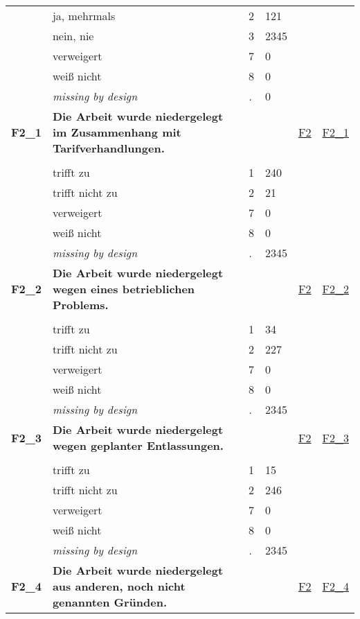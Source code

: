 \begin{longtable}{| L{2.45cm} | L{6cm} | C{1.5cm} | R{1cm} | C{2.25cm} | C{2.25cm} |}
   & ja, mehrmals & 2 & 121 &  &  \\ 
   & nein, nie & 3 & 2345 &  &  \\ 
   & verweigert & 7 & 0 &  &  \\ 
   & weiß nicht & 8 & 0 &  &  \\ 
   & \textit{missing by design} & \textit{.} & 0 &  &  \\ 
   \midrule
\textbf{F2\_1}\label{var:F2:1} & \textbf{Die Arbeit wurde niedergelegt im Zusammenhang mit Tarifverhandlungen.} &  &  & \hyperref[F2]{F2} & \hyperref[var:suf:F2:1]{F2\_1} \\ 
   &  &  &  &  &  \\ 
   & trifft zu & 1 & 240 &  &  \\ 
   & trifft nicht zu & 2 & 21 &  &  \\ 
   & verweigert & 7 & 0 &  &  \\ 
   & weiß nicht & 8 & 0 &  &  \\ 
   & \textit{missing by design} & \textit{.} & 2345 &  &  \\ 
   \midrule
\textbf{F2\_2}\label{var:F2:2} & \textbf{Die Arbeit wurde niedergelegt wegen eines betrieblichen Problems.} &  &  & \hyperref[F2]{F2} & \hyperref[var:suf:F2:2]{F2\_2} \\ 
   &  &  &  &  &  \\ 
   & trifft zu & 1 & 34 &  &  \\ 
   & trifft nicht zu & 2 & 227 &  &  \\ 
   & verweigert & 7 & 0 &  &  \\ 
   & weiß nicht & 8 & 0 &  &  \\ 
   & \textit{missing by design} & \textit{.} & 2345 &  &  \\ 
   \midrule
\textbf{F2\_3}\label{var:F2:3} & \textbf{Die Arbeit wurde niedergelegt wegen geplanter Entlassungen.} &  &  & \hyperref[F2]{F2} & \hyperref[var:suf:F2:3]{F2\_3} \\ 
   &  &  &  &  &  \\ 
   & trifft zu & 1 & 15 &  &  \\ 
   & trifft nicht zu & 2 & 246 &  &  \\ 
   & verweigert & 7 & 0 &  &  \\ 
   & weiß nicht & 8 & 0 &  &  \\ 
   & \textit{missing by design} & \textit{.} & 2345 &  &  \\ 
   \midrule
\textbf{F2\_4}\label{var:F2:4} & \textbf{Die Arbeit wurde niedergelegt aus anderen, noch nicht genannten Gründen.} &  &  & \hyperref[F2]{F2} & \hyperref[var:suf:F2:4]{F2\_4} \\ 

\end{longtable}
